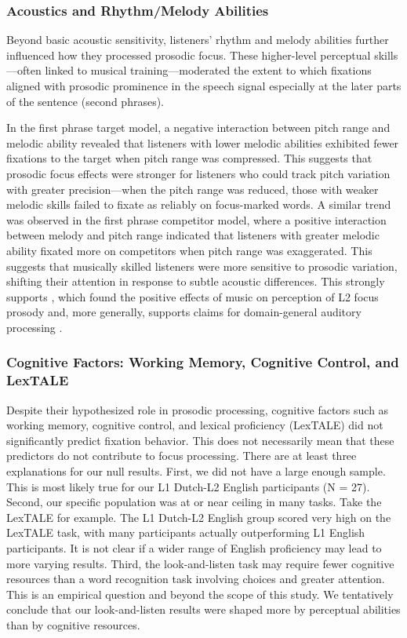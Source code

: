 \subsubsection{Acoustics and Rhythm/Melody Abilities}

Beyond basic acoustic sensitivity, listeners’ rhythm and melody abilities further influenced how they processed prosodic focus. These higher-level perceptual skills—often linked to musical training—moderated the extent to which fixations aligned with prosodic prominence in the speech signal especially at the later parts of the sentence (second phrases).

In the first phrase target model, a negative interaction between pitch range and melodic ability revealed that listeners with lower melodic abilities exhibited fewer fixations to the target when pitch range was compressed. This suggests that prosodic focus effects were stronger for listeners who could track pitch variation with greater precision—when the pitch range was reduced, those with weaker melodic skills failed to fixate as reliably on focus-marked words. A similar trend was observed in the first phrase competitor model, where a positive interaction between melody and pitch range indicated that listeners with greater melodic ability fixated more on competitors when pitch range was exaggerated. This suggests that musically skilled listeners were more sensitive to prosodic variation, shifting their attention in response to subtle acoustic differences. This strongly supports \cite{jansen2023influence}, which found the positive effects of music on perception of L2 focus prosody and, more generally, supports claims for domain-general auditory processing \citep{saito2022does, bramlett_wiener_24_speechprosody, bakkouche2025effects, Kachlicka_Saito_Tierney_2019}.


\subsubsection{Cognitive Factors: Working Memory, Cognitive Control, and LexTALE}

Despite their hypothesized role in prosodic processing, cognitive factors such as working memory, cognitive control, and lexical proficiency (LexTALE) did not significantly predict fixation behavior. This does not necessarily mean that these predictors do not contribute to focus processing. There are at least three explanations for our null results. First, we did not have a large enough sample. This is most likely true for our L1 Dutch-L2 English participants (N = 27). Second, our specific population was at or near ceiling in many tasks. Take the LexTALE for example. The L1 Dutch-L2 English group scored very high on the LexTALE task, with many participants actually outperforming L1 English participants. It is not clear if a wider range of English proficiency may lead to more varying results. Third, the look-and-listen task may require fewer cognitive resources than a word recognition task involving choices and greater attention. This is an empirical question and beyond the scope of this study. We tentatively conclude that our look-and-listen results were shaped more by perceptual abilities than by cognitive resources.


